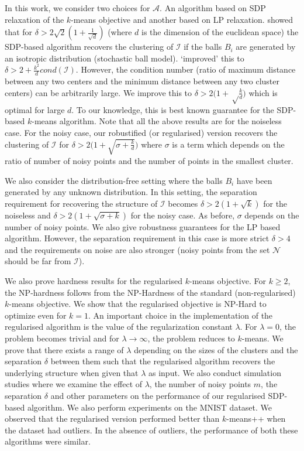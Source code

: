 \documentclass[12pt]{article}
\newcommand{\mc}{\mathcal}
\begin{document}
In this work, we consider two choices for $\mc A$. An algorithm based on SDP relaxation of the $k$-means objective and another based on LP relaxation. \cite{awasthi2015relax} showed that for $\delta > 2\sqrt{2}(1+\frac{1}{\sqrt d})$ (where $d$ is the dimension of the euclidean space) the SDP-based algorithm recovers the clustering of $\mc I$ if the balls $B_i$ are generated by an isotropic distribution (stochastic ball model). \cite{iguchi2015tightness} `improved' this to $\delta > 2 + \frac{k^2}{d}cond(\mc I)$. However, the condition number (ratio of maximum distance between any two centers and the minimum distance between any two cluster centers) can be arbitrarily large. We improve this to $\delta > 2\big(1+\sqrt\frac{k}{d}\big)$ which is optimal for large $d$. To our knowledge, this is best known guarantee for the SDP-based $k$-means algorithm. Note that all the above results are for the noiseless case. For the noisy case, our robustified (or regularised) version recovers the clustering of $\mc I$ for $\delta > 2\big(1+\sqrt{\sigma + \frac{k}{d}}\big)$ where $\sigma$ is a term which depends on the ratio of number of noisy points and the number of points in the smallest cluster. 

We also consider the distribution-free setting where  the balls $B_i$ have been generated by any unknown distribution. In this setting, the separation requirement for recovering the structure of $\mc I$ becomes $\delta > 2(1 + \sqrt{k})$ for the noiseless and $\delta > 2(1+\sqrt{\sigma + k})$ for the noisy case. As before, $\sigma$ depends on the number of noisy points. We also give robustness guarantees for the LP based algorithm. However, the separation requirement in this case is more strict $\delta > 4$ and the requirements on noise are also stronger (noisy points from the set $\mc N$ should be far from $\mc I$).  

We also prove hardness results for the regularised $k$-means objective. For $k \ge 2$, the NP-hardness follows from the NP-Hardness of the standard (non-regularised) $k$-means objective. We show that the regularised objective is NP-Hard to optimize even for $k=1$. An important choice in the implementation of the regularised algorithm is the value of the regularization constant $\lambda$. For $\lambda = 0$, the problem becomes trivial and for $\lambda \rightarrow \infty$, the problem reduces to $k$-means. We prove that there exists a range of $\lambda$ depending on the sizes of the clusters and the separation $\delta$ between them such that the regularised algorithm recovers the underlying structure when given that $\lambda$ as input. We also conduct simulation studies where we examine the effect of $\lambda$, the number of noisy points $m$, the separation $\delta$ and other parameters on the performance of our regularised SDP-based algorithm. We also perform experiments on the MNIST dataset. We observed that the regularised version performed better than $k$-means++ when the dataset had outliers. In the absence of outliers, the performance of both these algorithms were similar. 
\end{document}
